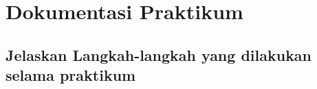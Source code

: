 \section{Dokumentasi Praktikum}

\subsection{Jelaskan Langkah-langkah yang dilakukan selama praktikum}

\begin{itemize}
  
  
  
\end{itemize}